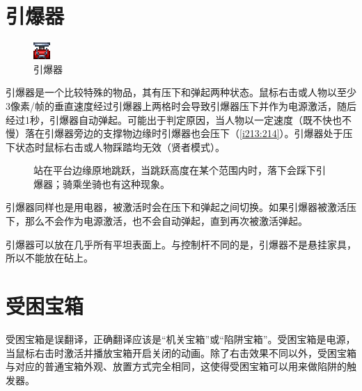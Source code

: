 \section{引爆器}
\begin{figure}[!ht]
\centering
\includegraphics{figures/Detonator.png}
\caption{引爆器}
\end{figure}
引爆器是一个比较特殊的物品，其有压下和弹起两种状态。鼠标右击或人物以至少3像素/帧的垂直速度经过引爆器上两格时会导致引爆器压下并作为电源激活，随后经过1秒，引爆器自动弹起。可能出于判定原因，当人物以一定速度（既不快也不慢）落在引爆器旁边的支撑物边缘时引爆器也会压下（\autoref{i213:214}）。引爆器处于压下状态时鼠标右击或人物踩踏均无效（贤者模式）。

\begin{figure}[!ht]
\begin{center}
\qquad
{}
\end{center}
\caption{\protect{}站在平台边缘原地跳跃，当跳跃高度在某个范围内时，落下会踩下引爆器；\protect{}骑乘坐骑也有这种现象。}
\label{i213:214}
\end{figure}

引爆器同样也是用电器，被激活时会在压下和弹起之间切换。如果引爆器被激活压下，那么不会作为电源激活，也不会自动弹起，直到再次被激活弹起。

引爆器可以放在几乎所有平坦表面上。与控制杆不同的是，引爆器不是悬挂家具，所以不能放在砧上。

\section{受困宝箱}
受困宝箱是误翻译，正确翻译应该是“机关宝箱”或“陷阱宝箱”。受困宝箱是电源，当鼠标右击时激活并播放宝箱开启关闭的动画。除了右击效果不同以外，受困宝箱与对应的普通宝箱外观、放置方式完全相同，这使得受困宝箱可以用来做陷阱的触发器。

